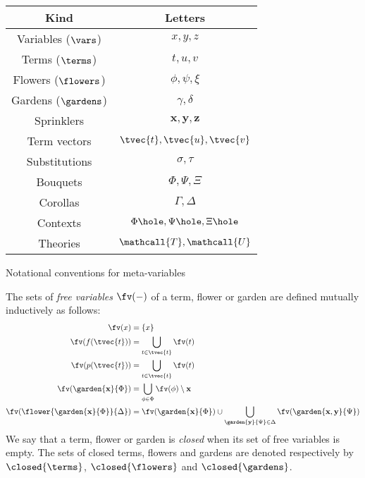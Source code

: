 \begin{marginfigure}
  \centering
  \begin{tabular}{|c|c|}
    \hline
    \bfseries Kind & \bfseries Letters \\
    \hline
    Variables ($\vars$) & $x, y, z$ \\
    Terms ($\terms$) & $t, u, v$ \\
    Flowers ($\flowers$) & $\phi, \psi, \xi$ \\
    Gardens ($\gardens$) & $\gamma, \delta$ \\
    Sprinklers & $\mathbf{x}, \mathbf{y}, \mathbf{z}$ \\
    Term vectors & $\tvec{t}, \tvec{u}, \tvec{v}$ \\
    Substitutions & $\sigma, \tau$ \\
    Bouquets & $\Phi, \Psi, \Xi$ \\
    Corollas & $\Gamma, \Delta$ \\
    Contexts & $\Phi\hole, \Psi\hole, \Xi\hole$ \\
    Theories & $\mathcall{T}, \mathcall{U}$ \\
    \hline
  \end{tabular}
  \caption{Notational conventions for meta-variables}
\end{marginfigure}

\begin{definition}
  The sets of \emph{free variables} $\fv(-)$ of a term, flower or garden are
  defined mutually inductively as follows:
  \begin{align*}
    \fv(x) &= \{x\} \\
    \fv(f(\tvec{t})) &= \bigcup_{t \in \tvec{t}}{\fv(t)} \\
    \fv(p(\tvec{t})) &= \bigcup_{t \in \tvec{t}}{\fv(t)} \\
    \fv(\garden{\mathbf{x}}{\Phi}) &= \bigcup_{\phi \in \Phi}{\fv(\phi)} \setminus \mathbf{x} \\
    \fv(\flower{\garden{\mathbf{x}}{\Phi}}{\Delta}) &= \fv(\garden{\mathbf{x}}{\Phi}) \cup \bigcup_{\garden{\mathbf{y}}{\Psi} \in \Delta}{\fv(\garden{\mathbf{x}, \mathbf{y}}{\Psi})}
  \end{align*}
  We say that a term, flower or garden is \emph{closed} when its set of free
  variables is empty. The sets of closed terms, flowers and gardens are denoted
  respectively by $\closed{\terms}$, $\closed{\flowers}$ and $\closed{\gardens}$.
\end{definition}

